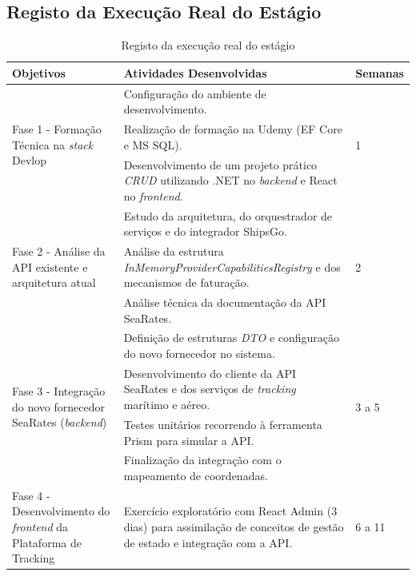 \documentclass[a4paper,12pt]{report}
\begin{document}
\begin{appendices}
\chapter{Registo da Execução Real do Estágio}
\label{anx:execucao-real}
\newpage
\begin{table}[H]
\centering
\caption{Registo da execução real do estágio}
\label{tab:execucao-real}
\footnotesize
\renewcommand{\arraystretch}{0.95}
\begin{tabular}{|p{}|p{}|p{}|}
\hline
\textbf{Objetivos} & \textbf{Atividades Desenvolvidas} & \textbf{Semanas} \\
\hline
\multirow{3}{0.21\textwidth}{Fase 1 - Formação Técnica na \textit{stack} Devlop}
& Configuração do ambiente de desenvolvimento.
& \multirow{3}{0.12\textwidth}{1} \\
\cline{2-2}
& Realização de formação na Udemy (EF Core e MS SQL). & \\
\cline{2-2}
& Desenvolvimento de um projeto prático \textit{CRUD} utilizando .NET no \textit{backend} e React no \textit{frontend}. & \\
\hline
\multirow{3}{0.21\textwidth}{Fase 2 - Análise da API existente e arquitetura atual}
& Estudo da arquitetura, do orquestrador de serviços e do integrador ShipsGo.
& \multirow{3}{0.12\textwidth}{2} \\
\cline{2-2}
& Análise da estrutura \textit{InMemoryProvider\-CapabilitiesRegistry} e dos mecanismos de faturação. & \\
\cline{2-2}
& Análise técnica da documentação da API SeaRates. & \\
\hline
\multirow{4}{0.21\textwidth}{Fase 3 - Integração do novo fornecedor SeaRates (\textit{backend})}
& Definição de estruturas \textit{DTO} e configuração do novo fornecedor no sistema.
& \multirow{4}{0.12\textwidth}{3 a 5} \\
\cline{2-2}
& Desenvolvimento do cliente da API SeaRates e dos serviços de \textit{tracking} marítimo e aéreo. & \\
\cline{2-2}
& Testes unitários recorrendo à ferramenta Prism para simular a API. & \\
\cline{2-2}
& Finalização da integração com o mapeamento de coordenadas. & \\
\hline
\multirow{4}{0.21\textwidth}{Fase 4 - Desenvolvimento do \textit{frontend} da Plataforma de Tracking}
& Exercício exploratório com React Admin (3 dias) para assimilação de conceitos de gestão de estado e integração com a API.
& \multirow{4}{0.12\textwidth}{6 a 11} \\

\end{tabular}
\end{table}
\end{appendices}
\end{document}
